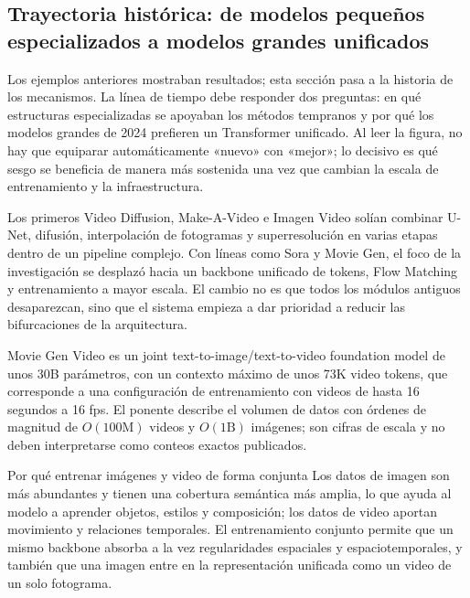 \subsection{Trayectoria histórica: de modelos pequeños especializados a modelos grandes unificados}

Los ejemplos anteriores mostraban resultados; esta sección pasa a la historia de los mecanismos. La línea de tiempo debe responder dos preguntas: en qué estructuras especializadas se apoyaban los métodos tempranos y por qué los modelos grandes de 2024 prefieren un Transformer unificado. Al leer la figura, no hay que equiparar automáticamente «nuevo» con «mejor»; lo decisivo es qué sesgo se beneficia de manera más sostenida una vez que cambian la escala de entrenamiento y la infraestructura.


Los primeros Video Diffusion, Make-A-Video e Imagen Video solían combinar U-Net, difusión, interpolación de fotogramas y superresolución en varias etapas dentro de un pipeline complejo. Con líneas como Sora y Movie Gen, el foco de la investigación se desplazó hacia un backbone unificado de tokens, Flow Matching y entrenamiento a mayor escala. El cambio no es que todos los módulos antiguos desaparezcan, sino que el sistema empieza a dar prioridad a reducir las bifurcaciones de la arquitectura.


Movie Gen Video es un joint text-to-image/text-to-video foundation model de unos 30B parámetros, con un contexto máximo de unos 73K video tokens, que corresponde a una configuración de entrenamiento con videos de hasta 16 segundos a 16 fps. El ponente describe el volumen de datos con órdenes de magnitud de $O(100\mathrm{M})$ videos y $O(1\mathrm{B})$ imágenes; son cifras de escala y no deben interpretarse como conteos exactos publicados.

\begin{knowledgebox}{Por qué entrenar imágenes y video de forma conjunta}
Los datos de imagen son más abundantes y tienen una cobertura semántica más amplia, lo que ayuda al modelo a aprender objetos, estilos y composición; los datos de video aportan movimiento y relaciones temporales. El entrenamiento conjunto permite que un mismo backbone absorba a la vez regularidades espaciales y espaciotemporales, y también que una imagen entre en la representación unificada como un video de un solo fotograma.
\end{knowledgebox}


